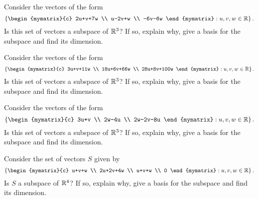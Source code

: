 \begin{enumialphparenastyle}
\begin{ex} Consider the vectors of the form 
\begin{equation*}
\set{\begin{mymatrix}{c}
2u+v+7w \\ 
u-2v+w \\ 
-6v-6w
\end{mymatrix} :u,v,w\in \R} .
\end{equation*}
Is this set of vectors a subspace of $\mathbb{R}^{3}$? If so, explain why,
give a basis for the subspace and find its dimension.
\end{ex}

\begin{ex} Consider the vectors of the form 
\begin{equation*}
\set{\begin{mymatrix}{c}
3u+v+11w \\ 
18u+6v+66w \\ 
28u+8v+100w
\end{mymatrix} :u,v,w\in \R} .
\end{equation*}
Is this set of vectors a subspace of $\mathbb{R}^{3}$? If so, explain why,
give a basis for the subspace and find its dimension.
\end{ex}

\begin{ex} Consider the vectors of the form 
\begin{equation*}
\set{\begin{mymatrix}{c}
3u+v \\ 
2w-4u \\ 
2w-2v-8u
\end{mymatrix} :u,v,w\in \R} .
\end{equation*}
Is this set of vectors a subspace of $\mathbb{R}^{3}$? If so, explain why,
give a basis for the subspace and find its dimension.
\end{ex}

\begin{ex} Consider the set of vectors $S$ given by  
\begin{equation*}
\set{\begin{mymatrix}{c}
u+v+w \\ 
2u+2v+4w \\ 
u+v+w \\ 
0
\end{mymatrix} :u,v,w\in \R} .
\end{equation*}
Is $S$ a subspace of $\mathbb{R}^{4}$? If so, explain why,
give a basis for the subspace and find its dimension.
\end{ex}


\end{enumialphparenastyle}
